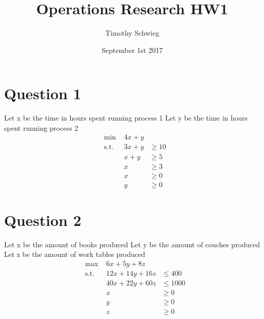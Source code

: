 \documentclass[12pt, letterpaper]{paper}
\title{ Operations Research HW1 }
\author{ Timothy Schwieg }
\date { September 1st 2017 }
\begin{document}
\maketitle

\section*{Question 1}
Let x be the time in hours spent running process 1
\newline
Let y be the time in hours spent running process 2
\begin{equation*}
\begin{alignedat}{3}
&\text{min }&4x + y&\\
&\text{s.t. } &3x + y &\geq 10 \\
&  &x + y &\geq 5 \\
& &x &\geq 3\\
& & x &\geq 0\\
& &y &\geq 0
\end{alignedat}
\end{equation*}

\section*{Question 2}
Let x be the amount of books produced
\newline
Let y be the amount of couches produced
\newline
Let z be the amount of work tables produced
\begin{equation*}
\begin{alignedat}{3}
&\text{max }&6x + 5y + 8z&\\
&\text{s.t. } &12x + 14y + 16z&\leq 400 \\
&  &40x + 22y + 60z&\leq 1000 \\
& &x &\geq 0\\
& & y &\geq 0\\
& &z &\geq 0
\end{alignedat}
\end{equation*}
\end{document}

